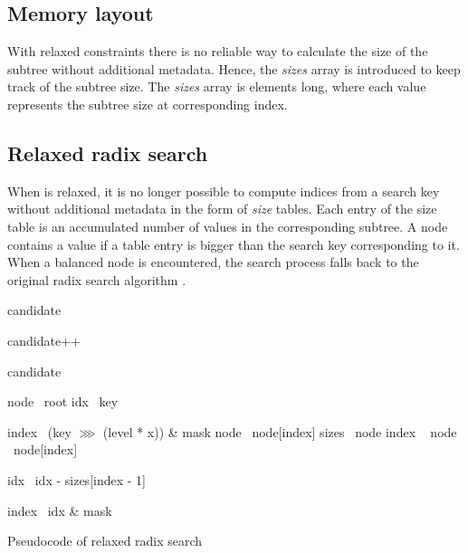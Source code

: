 \subsection{Memory layout}
With relaxed \treerrb{} constraints there is no reliable way to calculate the size of the subtree without additional metadata. Hence, the \emph{sizes} array is introduced to keep track of the subtree size. The \emph{sizes} array is \m{} elements long, where each value represents the subtree size at corresponding index. %

\subsection{Relaxed radix search}
When \rbtree{} is relaxed, it is no longer possible to compute indices from a search key without additional metadata in the form of \emph{size} tables. Each entry of the size table is an accumulated number of values in the corresponding subtree. A node contains a value if a table entry is bigger than the search key corresponding to it. When a balanced node is encountered, the search process falls back to the original radix search algorithm .

\begin{listing}[!ht]

    \begin{algorithmic}[1]
            \State candidate 

                \State candidate++
            \EndIf

            \State \Return candidate
        \EndFunction

        \State

            \State node \la\ root
            \State idx \la\ key

                    \State index \la\ (key $\ggg$ (level * x)) \& mask
                    \State node \la\ node[index]
                \Else
                    \State sizes \la\ node
                    \State index \la\ 
                    \State node \la\ node[index]

                        \State idx \la\ idx - sizes[index - 1]
                    \EndIf
                \EndIf
            \EndFor

            \State index \la\ idx \& mask
            \State {}
        \EndFunction
    \end{algorithmic}

    \caption{Pseudocode of relaxed radix search}
    \label{lst:rrb-tree-relaxed-radix-search}
\end{listing}

